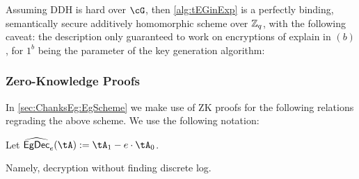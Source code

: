 \begin{theorem}\label{thm:tEGinExp}
	Assuming DDH is hard over $\cG$, then \cref{alg:tEGinExp} is  a perfectly binding,  semantically secure additively homomorphic scheme over ${\mathbb Z}_q$, with the following caveat:  the description only guaranteed to work on encryptions of explain in $(b)$,   for $1^b$ being the parameter  of the key generation algorithm:
\end{theorem}



\subsubsection{Zero-Knowledge Proofs}\label{sec:ChanksEg:Eg:ZK}


In \cref{sec:ChanksEg:EgScheme} we make use of ZK proofs for the following relations regrading the above scheme.   We use the following notation:
\begin{notation}
Let   $\wEgDec_e (\tA) \eqdef \tA_1- e\cdot \tA_0$.  
\end{notation}
Namely, decryption without finding discrete log.  


